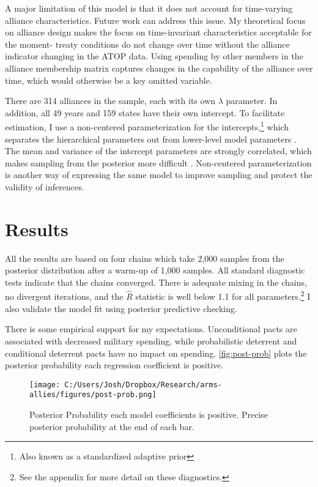 \documentclass[12pt]{article}
\begin{document}
A major limitation of this model is that it does not account for time-varying alliance characteristics. Future work can address this issue. My theoretical focus on alliance design makes the focus on time-invariant characteristics acceptable for the moment- treaty conditions do not change over time without the alliance indicator changing in the ATOP data. Using spending by other members in the alliance membership matrix captures changes in the capability of the alliance over time, which would otherwise be a key omitted variable. 

There are 314 alliances in the sample, each with its own $\lambda$ parameter. In addition, all 49 years and 159 states have their own intercept. To facilitate estimation, I use a non-centered parameterization for the intercepts,\footnote{Also known as a standardized adaptive prior} which separates the hierarchical parameters out from lower-level model parameters \citep{McElreath2016}. The mean and variance of the intercept parameters are strongly correlated, which makes sampling from the posterior more difficult \citep{BetancourtGirolani2015}. Non-centered parameterization is another way of expressing the same model to improve sampling and protect the validity of inferences. 


\section*{Results} 

All the results are based on four chains which take 2,000 samples from the posterior distribution after a warm-up of 1,000 samples. All standard diagnostic tests indicate that the chains converged. There is adequate mixing in the chains, no divergent iterations, and the $\hat{R}$ statistic is well below 1.1 for all parameters.\footnote{See the appendix for more detail on these diagnostics.} I also validate the model fit using posterior predictive checking. 

There is some empirical support for my expectations. Unconditional pacts are associated with decreased military spending, while probabilistic deterrent and conditional deterrent pacts have no impact on spending. \autoref{fig:post-prob} plots the posterior probability each regression coefficient is positive. 

\begin{figure}[htbp]
	\centering
	\texttt{[image: C:/Users/Josh/Dropbox/Research/arms-allies/figures/post-prob.png]}
	\caption{Posterior Probability each model coefficients is positive. Precise posterior probability at the end of each bar.}
	\label{fig:post-prob}
\end{figure}
\end{document}
